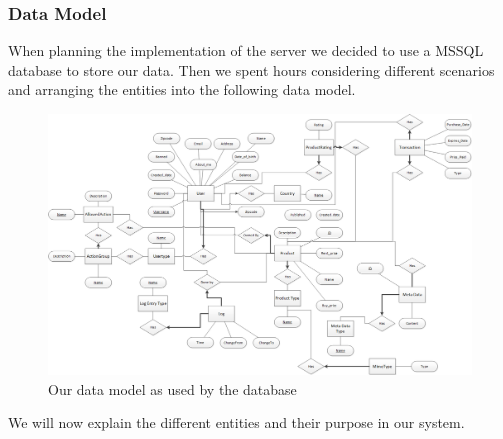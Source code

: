 \subsubsection{Data Model}
When planning the implementation of the server we decided to use a MSSQL database to store our data. Then we spent hours  considering different scenarios and arranging the entities into the following data model.
\begin{figure}[H]
  \includegraphics[width=\textwidth]{illustrations/Datamodel.png}
  \caption{Our data model as used by the database}
  \label{fig:datamodel}
\end{figure}
We will now explain the different entities and their purpose in our system.

